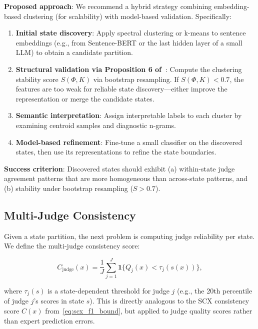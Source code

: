 \documentclass[11pt,twocolumn]{article}
\begin{document}
\textbf{Proposed approach}: We recommend a hybrid strategy combining embedding-based clustering (for scalability) with model-based validation. Specifically:
\begin{enumerate}
    \item \textbf{Initial state discovery}: Apply spectral clustering or k-means to sentence embeddings (e.g., from Sentence-BERT or the last hidden layer of a small LLM) to obtain a candidate partition.
    \item \textbf{Structural validation via Proposition 6 of~\cite{scx2026}}: Compute the clustering stability score $S(\Phi, K)$ via bootstrap resampling. If $S(\Phi, K) < 0.7$, the features are too weak for reliable state discovery---either improve the representation or merge the candidate states.
    \item \textbf{Semantic interpretation}: Assign interpretable labels to each cluster by examining centroid samples and diagnostic n-grams.
    \item \textbf{Model-based refinement}: Fine-tune a small classifier on the discovered states, then use its representations to refine the state boundaries.
\end{enumerate}

\textbf{Success criterion}: Discovered states should exhibit (a) within-state judge agreement patterns that are more homogeneous than across-state patterns, and (b) stability under bootstrap resampling ($S > 0.7$).

\subsection{Multi-Judge Consistency}
\label{sec:multi_judge}

Given a state partition, the next problem is computing judge reliability per state. We define the multi-judge consistency score:

\begin{equation}
C_{\text{judge}}(x) = \frac{1}{J} \sum_{j=1}^J \mathbf{1}\{Q_j(x) < \tau_j(s(x))\},
\label{eq:multi_judge_consistency}
\end{equation}

where $\tau_j(s)$ is a state-dependent threshold for judge $j$ (e.g., the 20th percentile of judge $j$'s scores in state $s$). This is directly analogous to the SCX consistency score $C(x)$ from~\eqref{eq:scx_f1_bound}, but applied to judge quality scores rather than expert prediction errors.
\end{document}
